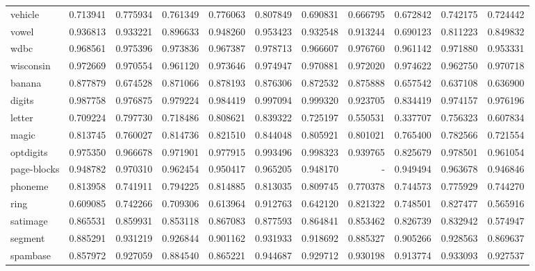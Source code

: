 \begin{tabular}{lrrrrrrrrrr}
vehicle         &   0.713941 &  0.775934 &  0.761349 &  0.776063 &  0.807849 &  0.690831 &  0.666795 &  0.672842 &  0.742175 &  0.724442 \\
vowel           &   0.936813 &  0.933221 &  0.896633 &  0.948260 &  0.953423 &  0.932548 &  0.913244 &  0.690123 &  0.811223 &  0.849832 \\
wdbc            &   0.968561 &  0.975396 &  0.973836 &  0.967387 &  0.978713 &  0.966607 &  0.976760 &  0.961142 &  0.971880 &  0.953331 \\
wisconsin       &   0.972669 &  0.970554 &  0.961120 &  0.973646 &  0.974947 &  0.970881 &  0.972020 &  0.974622 &  0.962750 &  0.970718 \\
banana          &   0.877879 &  0.674528 &  0.871066 &  0.878193 &  0.876306 &  0.872532 &  0.875888 &  0.657542 &  0.637108 &  0.636900 \\
digits          &   0.987758 &  0.976875 &  0.979224 &  0.984419 &  0.997094 &  0.999320 &  0.923705 &  0.834419 &  0.974157 &  0.976196 \\
letter          &   0.709224 &  0.797730 &  0.718486 &  0.808621 &  0.839322 &  0.725197 &  0.550531 &  0.337707 &  0.756323 &  0.607834 \\
magic           &   0.813745 &  0.760027 &  0.814736 &  0.821510 &  0.844048 &  0.805921 &  0.801021 &  0.765400 &  0.782566 &  0.721554 \\
optdigits       &   0.975350 &  0.966678 &  0.971901 &  0.977915 &  0.993496 &  0.998323 &  0.939765 &  0.825679 &  0.978501 &  0.961054 \\
page-blocks     &   0.948782 &  0.970310 &  0.962454 &  0.950417 &  0.965205 &  0.948170 &       - &  0.949494 &  0.963678 &  0.946846 \\
phoneme         &   0.813958 &  0.741911 &  0.794225 &  0.814885 &  0.813035 &  0.809745 &  0.770378 &  0.744573 &  0.775929 &  0.744270 \\
ring            &   0.609085 &  0.742266 &  0.709306 &  0.613964 &  0.912763 &  0.642120 &  0.821322 &  0.748501 &  0.827477 &  0.565916 \\
satimage        &   0.865531 &  0.859931 &  0.853118 &  0.867083 &  0.877593 &  0.864841 &  0.853462 &  0.826739 &  0.832942 &  0.574947 \\
segment         &   0.885291 &  0.931219 &  0.926844 &  0.901162 &  0.931933 &  0.918692 &  0.885327 &  0.905266 &  0.928563 &  0.869637 \\
spambase        &   0.857972 &  0.927059 &  0.884540 &  0.865221 &  0.944687 &  0.929712 &  0.930198 &  0.913774 &  0.933093 &  0.927537 \\

\end{tabular}
